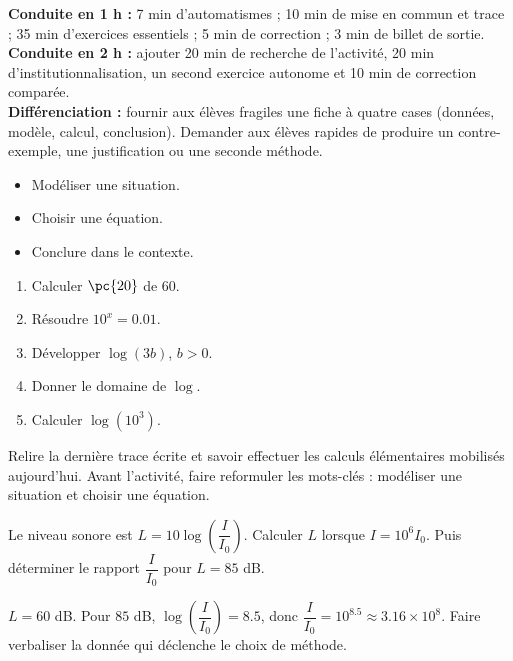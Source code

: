 \ifmxteacher
\begin{method}
\textbf{Conduite en 1 h :} 7 min d'automatismes ; 10 min de mise en commun et trace ; 35 min d'exercices essentiels ; 5 min de correction ; 3 min de billet de sortie.\\
\textbf{Conduite en 2 h :} ajouter 20 min de recherche de l'activité, 20 min d'institutionnalisation, un second exercice autonome et 10 min de correction comparée.\\
\textbf{Différenciation :} fournir aux élèves fragiles une fiche à quatre cases (données, modèle, calcul, conclusion). Demander aux élèves rapides de produire un contre-exemple, une justification ou une seconde méthode.
\end{method}
\fi
{}
\begin{objectives}\begin{itemize}\item Modéliser une situation.\item Choisir une équation.\item Conclure dans le contexte.\end{itemize}\end{objectives}
\begin{fluency}\begin{enumerate}\item Calculer $\pc{20}$ de $60$. \item Résoudre $10^x=\num{0,01}$. \item Développer $\log(3b)$, $b>0$. \item Donner le domaine de $\log$. \mxblank{$]0,+\infty[$}\item Calculer $\log(10^3)$. \end{enumerate}\end{fluency}
\begin{prerequisites}Relire la dernière trace écrite et savoir effectuer les calculs élémentaires mobilisés aujourd'hui. Avant l'activité, faire reformuler les mots-clés : modéliser une situation et choisir une équation.\end{prerequisites}

\begin{activity}
Le niveau sonore est $L=10\log\!\left(\dfrac I{I_0}\right)$. Calculer $L$ lorsque $I=10^6I_0$. Puis déterminer le rapport $\dfrac I{I_0}$ pour $L=85$ dB.

\end{activity}
\begin{solution}$L=60$ dB. Pour $85$ dB, $\log\!\left(\dfrac I{I_0}\right)=\num{8,5}$, donc $\dfrac I{I_0}=10^{\num{8,5}}\approx\num{3,16}\times10^8$. Faire verbaliser la donnée qui déclenche le choix de méthode.\end{solution}


